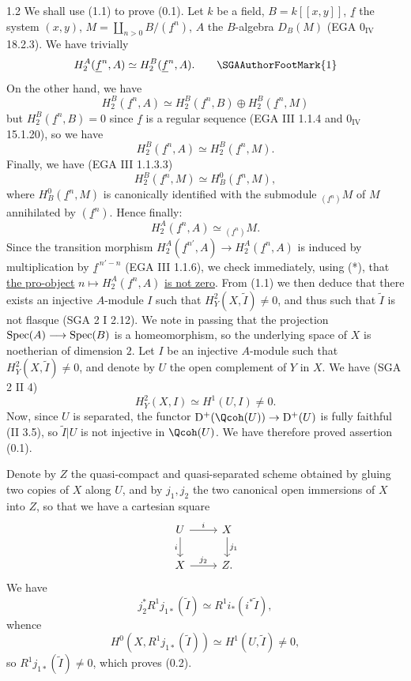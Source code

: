 1.2 We shall use (1.1) to prove (0.1). Let $k$ be a field, $B=k[[x,y]]$, $\underline{f}$ the system $(x,y)$, $M=\coprod_{n>0}B/(\underline{f}^n)$, $A$ the $B$-algebra $D_B(M)$ (EGA $0_{\mathrm{IV}}$ 18.2.3). We have trivially
\[
 H_2^A(\underline{f}^n,A)\simeq H_2^B(\underline{f}^n,A).\qquad\text{\SGAAuthorFootMark{1}}
\]
On the other hand, we have
\[
 H_2^B(\underline{f}^n,A)\simeq H_2^B(\underline{f}^n,B)\oplus H_2^B(\underline{f}^n,M)
\]
but $H_2^B(\underline{f}^n,B)=0$ since $\underline{f}$ is a regular sequence (EGA III 1.1.4 and $0_{\mathrm{IV}}$ 15.1.20), so we have
\[
 H_2^B(\underline{f}^n,A)\simeq H_2^B(\underline{f}^n,M).
\]
Finally, we have (EGA III 1.1.3.3)
\[
 H_2^B(\underline{f}^n,M)\simeq H_B^0(\underline{f}^n,M),
\]
where $H_B^0(\underline{f}^n,M)$ is canonically identified with the submodule ${}_{(\underline{f}^n)}M$ of $M$ annihilated by $(\underline{f}^n)$. Hence finally:
\begin{equation}\tag{*}
 H_2^A(\underline{f}^n,A)\simeq {}_{(\underline{f}^n)}M.
\end{equation}
Since the transition morphism $H_2^A(\underline{f}^{n'},A)\longrightarrow H_2^A(\underline{f}^n,A)$ is induced by multiplication by $\underline{f}^{\,n'-n}$ (EGA III 1.1.6), we check immediately, using (*), that \uline{the pro-object} $n\mapsto H_2^A(\underline{f}^n,A)$ \uline{is not zero}. From (1.1) we then deduce that there exists an injective $A$-module $I$ such that $H^2_Y(X,\widetilde I)\ne0$, and thus such that $\widetilde I$ is not flasque (SGA 2 I 2.12). We note in passing that the projection $\operatorname{Spec}(A)\longrightarrow\operatorname{Spec}(B)$ is a homeomorphism,
%
so the underlying space of $X$ is noetherian of dimension $2$. Let $I$ be an injective $A$-module such that $H^2_Y(X,\widetilde I)\ne0$, and denote by $U$ the open complement of $Y$ in $X$. We have (SGA 2 II 4)
\[
 H^2_Y(X,I)\simeq H^1(U,I)\ne0.
\]
Now, since $U$ is separated, the functor $\mathrm D^+(\Qcoh(U))\to\mathrm D^+(U)$ is fully faithful (II 3.5), so $\widetilde I|U$ is not injective in $\Qcoh(U)$. We have therefore proved assertion (0.1).

Denote by $Z$ the quasi-compact and quasi-separated scheme obtained by gluing two copies of $X$ along $U$, and by $j_1,j_2$ the two canonical open immersions of $X$ into $Z$, so that we have a cartesian square
\[
\begin{tikzcd}
 U \arrow[r,"i"] \arrow[d,"i"'] & X \arrow[d,"j_1"]\\
 X \arrow[r,"j_2"] & Z .
\end{tikzcd}
\]
We have
\[
 j_2^*R^1j_{1*}(\widetilde I)\simeq R^1i_*(i^*\widetilde I),
\]
whence
\[
 H^0(X,R^1j_{1*}(\widetilde I))\simeq H^1(U,\widetilde I)\ne0,
\]
so $R^1j_{1*}(\widetilde I)\ne0$, which proves (0.2).

